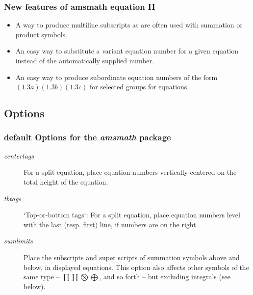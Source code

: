 \documentclass[12pt]{beamer}
\begin{document}
  \begin{frame}
    \frametitle{New features of amsmath equation II }
    \begin{itemize}
      \item A way to produce multiline subscripts as are often used with summation or product symbols.
      \item An easy way to substitute a variant equation number for a given equation instead of the automatically supplied number.
      \item An easy way to produce subordinate equation numbers of the form $(1.3a) (1.3b) (1.3c)$ for selected groups for equations.
    \end{itemize}
  \end{frame}
  \subsection{Options}
  \begin{frame}
    \frametitle{ default Options for the \emph{amsmath} package}
    \begin{description}
      \item[\emph{centertags}] For a split equation, place equation numbers vertically centered on the total height of the equation.
      \item[\emph{tbtags}] `Top-or-bottom tags`: For a split equation, place equation numbers level with the last (resp. first) line, if numbers are on the right.
      \item [\emph{sumlimits}] Place the subscripts and super scripts of summation symbols above and below, in displayed equations. This option also affects other symbols of the same type -- $\prod \coprod \bigotimes \bigoplus$, and so forth -- but excluding integrals (see below).
     \end{description}
  \end{frame}
\end{document}
